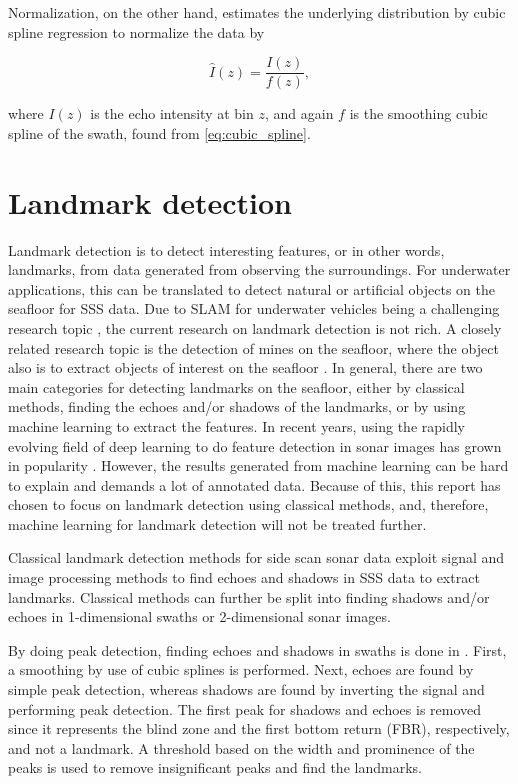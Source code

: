 Normalization, on the other hand, estimates the underlying distribution by cubic spline regression to normalize the data by

\begin{equation}
    \hat{I}(z) = \frac{I(z)}{f(z)},
    \label{eq:swath_norm}
\end{equation}

where $I(z)$ is the echo intensity at bin $z$, and again $f$ is the smoothing cubic spline of the swath, found from \cref{eq:cubic_spline}.

\section{Landmark detection}

Landmark detection is to detect interesting features, or in other words, landmarks, from data generated from observing the surroundings. For underwater applications, this can be translated to detect natural or artificial objects on the seafloor for SSS data. Due to SLAM for underwater vehicles being a challenging research topic \cite{Hidalgo2015ReviewTechniques}, the current research on landmark detection is not rich. A closely related research topic is the detection of mines on the seafloor, where the object also is to extract objects of interest on the seafloor \cite{Picard2016DetectionDimensionality}. In general, there are two main categories for detecting landmarks on the seafloor, either by classical methods, finding the echoes and/or shadows of the landmarks, or by using machine learning to extract the features. In recent years, using the rapidly evolving field of deep learning to do feature detection in sonar images has grown in popularity \cite{Wang2020ImageSonar, Zhou2022NonlinearFeatures}. However, the results generated from machine learning can be hard to explain and demands a lot of annotated data. Because of this, this report has chosen to focus on landmark detection using classical methods, and, therefore, machine learning for landmark detection will not be treated further.

Classical landmark detection methods for side scan sonar data exploit signal and image processing methods to find echoes and shadows in SSS data to extract landmarks. Classical methods can further be split into finding shadows and/or echoes in 1-dimensional swaths or 2-dimensional sonar images.

By doing peak detection, finding echoes and shadows in swaths is done in \cite{Al-Rawi2017LandmarkImages}. First, a smoothing by use of cubic splines is performed. Next, echoes are found by simple peak detection, whereas shadows are found by inverting the signal and performing peak detection. The first peak for shadows and echoes is removed since it represents the blind zone and the first bottom return (FBR), respectively, and not a landmark. A threshold based on the width and prominence of the peaks is used to remove insignificant peaks and find the landmarks.  

